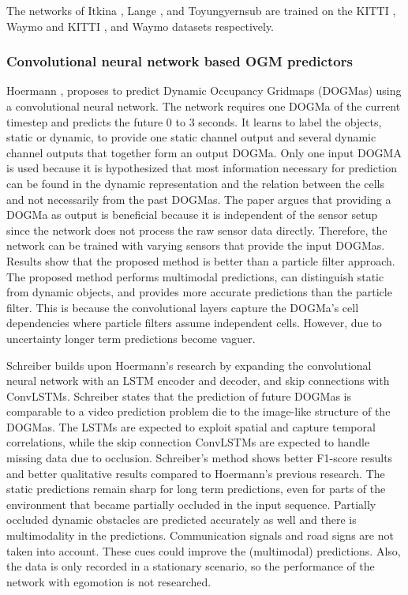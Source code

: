 The networks of Itkina \cite{itkina2019dynamic}, Lange \cite{lange2020attention}, and Toyungyernsub \cite{toyungyernsub2020double} are trained on the KITTI \cite{geiger2013vision}, Waymo \cite{sun2020scalability} and KITTI \cite{geiger2013vision}, and Waymo \cite{sun2020scalability} datasets respectively.  

\subsubsection{Convolutional neural network based OGM predictors}
Hoermann \cite{hoermann2018dynamic}, proposes to predict Dynamic Occupancy Gridmaps (DOGMas) using a convolutional neural network. The network requires one DOGMa of the current timestep and predicts the future $0$ to $3$ seconds. It learns to label the objects, static or dynamic, to provide one static channel output and several dynamic channel outputs that together form an output DOGMa. Only one input DOGMA is used because it is hypothesized that most information necessary for prediction can be found in the dynamic representation and the relation between the cells and not necessarily from the past DOGMas. The paper argues that providing a DOGMa as output is beneficial because it is independent of the sensor setup since the network does not process the raw sensor data directly. Therefore, the network can be trained with varying sensors that provide the input DOGMas. Results show that the proposed method is better than a particle filter approach. The proposed method performs multimodal predictions, can distinguish static from dynamic objects, and provides more accurate predictions than the particle filter. This is because the convolutional layers capture the DOGMa's cell dependencies where particle filters assume independent cells. However, due to uncertainty longer term predictions become vaguer. 

Schreiber \cite{schreiber2019long} builds upon Hoermann's \cite{hoermann2018dynamic} research by expanding the convolutional neural network with an LSTM encoder and decoder, and skip connections with ConvLSTMs. Schreiber \cite{schreiber2019long} states that the prediction of future DOGMas is comparable to a video prediction problem die to the image-like structure of the DOGMas. The LSTMs are expected to exploit spatial and capture temporal correlations, while the skip connection ConvLSTMs are expected to handle missing data due to occlusion. Schreiber's \cite{schreiber2019long} method shows better F1-score results and better qualitative results compared to Hoermann's \cite{hoermann2018dynamic} previous research. The static predictions remain sharp for long term predictions, even for parts of the environment that became partially occluded in the input sequence. Partially occluded dynamic obstacles are predicted accurately as well and there is multimodality in the predictions. Communication signals and road signs are not taken into account. These cues could improve the (multimodal) predictions. Also, the data is only recorded in a stationary scenario, so the performance of the network with egomotion is not researched.   

